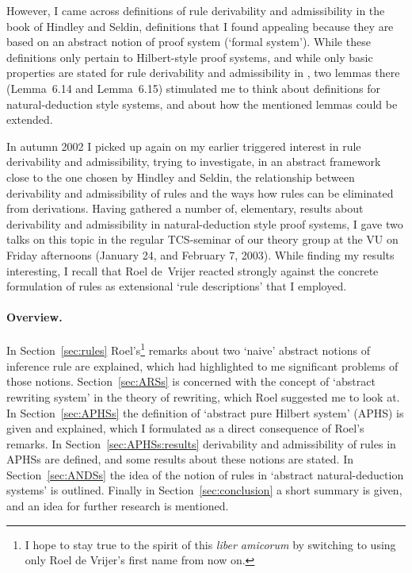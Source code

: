 \documentclass[envcountsame,runningheads]{llncs}
\newcommand{\APHS}{A\hspace*{-0.3pt}P\hspace*{-0.6pt}H\hspace*{-0.4pt}S}
\begin{document}
However, I came across definitions of rule derivability and admissibility  
in the book \cite[p.70]{hind:seld:1986} of Hindley and Seldin, definitions that I found
appealing because they are based on an abstract notion of proof system
(`formal system'). 
While these definitions only pertain to Hilbert-style proof systems,
and while only basic properties are stated for rule
derivability and admissibility in \cite{hind:seld:1986},
two lemmas there (Lemma~6.14 and Lemma~6.15) stimulated me to think
about definitions for natural-deduction style systems,
and about how the mentioned lemmas could be extended.

In autumn 2002 I picked up again on my earlier triggered interest in
rule derivability and admissibility,
trying to investigate, in an abstract framework close to the one chosen
by Hindley and Seldin,
the relationship between derivability and admissibility of rules 
and 
the ways how rules can be eliminated from derivations.
Having gathered a number of, elementary, results about
derivability and admissibility in natural-deduction style proof systems,
I gave two talks on this topic in the regular TCS-seminar of our theory
group at the VU on Friday afternoons (January 24, and February 7, 2003).
While finding my results interesting, I recall that Roel de~Vrijer
reacted strongly against the concrete formulation of rules as extensional 
`rule descriptions' that I employed.

\paragraph{Overview.}
In Section~\ref{sec:rules} Roel's\footnote{I hope to stay true to the spirit of this 
            \emph{liber amicorum} by switching to
            using only Roel de Vrijer's first name from now on.} 
remarks about two `naive' abstract notions of inference rule are explained,
which had highlighted to me significant problems of those notions. 
Section~\ref{sec:ARSs} is concerned with the concept
of `abstract rewriting system' in the theory of rewriting, which
Roel suggested me to look at.
In Section~\ref{sec:APHSs} the definition of `abstract pure Hilbert system'
(\APHS) is given and explained, which I formulated
as a direct consequence of Roel's remarks. 
In Section~\ref{sec:APHSs:results} derivability and admissibility of
rules in \APHS{s} are defined, and some results about these notions
are stated.  In Section~\ref{sec:ANDSs}
the idea of the notion of rules in `abstract natural-deduction systems'
is outlined. Finally in Section~\ref{sec:conclusion} a short summary
is given, and an idea for further research is mentioned.
\end{document}
